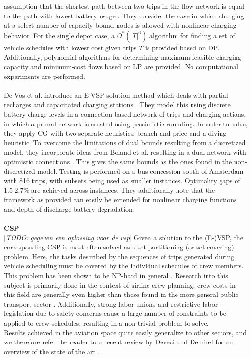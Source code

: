 \documentclass[]{article}
\newcommand{\todo}[1]{{\color{red}[\textit{TODO: #1}]}}
\begin{document}
assumption that the shortest path between two trips in the flow network is
equal to the path with lowest battery usage \cite{Pulyassary2024}. They
consider the case in which charging at a select number of capacity bound nodes
is allowed with nonlinear charging behavior. For the single depot case, a
$O^*(|T|^6)$ algorithm for finding a set of vehicle schedules with lowest cost
given trips $T$ is provided based on DP. Additionally, polynomial algorithms
for determining maximum feasible charging capacity and minimum-cost flows based
on LP are provided. No computational experiments are performed. \\\\
De Vos et al. introduce an E-VSP solution method which deals with partial
recharges and capacitated charging stations \cite{deVos2024}. They model this
using discrete battery charge levels in a connection-based network of trips and
charging actions, in which a primal network is created using pessimistic
rounding. In order to solve, they apply CG with two separate heuristics:
branch-and-price and a diving heuristic. To overcome the limitations of dual
bounds resulting from a discretized model, they incorporate ideas from Boland
et al. resulting in a dual network with optimistic connections
\cite{Boland2017}. This gives the same bounds as the ones found in the
non-discretized model. Testing is performed on a bus concession south of
Amsterdam with 816 trips, with subsets being used as smaller instances.
Optimality gaps of 1.5-2.7\% are achieved across instances. They additionally
note that the framework as provided can easily be extended for nonlinear
charging functions and depth-of-discharge battery degradation. \\\\

\noindent \textbf{CSP}\\
\todo{gegeven een oplossing voor de vsp}
Given a solution to the (E-)VSP, the corresponding CSP is most often solved as a set partitioning (or set covering) problem. Here, the tasks described by the sequences of trips generated during vehicle scheduling must be covered by the individual schedules of crew members. This problem has been shown to be NP-hard in general \cite{Fischetti1989}. Research into this subject is primarily done in the context of airline crew planning; crew costs in this field are generally even higher than those found in the more general public transport sector \cite{Barnhart2003}. Additionally, strong labor unions and restrictive labor legislation due to safety concerns cause a large number of constraints to be applied to crew schedules, resulting in a non-trivial problem to solve. \\
Results achieved in the aviation space quite easily generalize to other sectors, and we therefore refer the reader to a recent review by Deveci and Demirel for an overview of the state of the art \cite{Deveci2018}. \\\\
\end{document}
